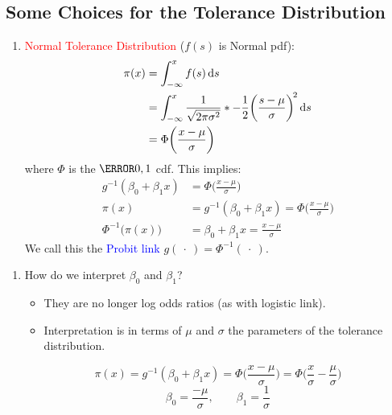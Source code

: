 \documentclass[oneside]{book}\usepackage[]{graphicx}\usepackage[svgnames]{xcolor}
\let\exp\relax%
\begin{document}
\subsection*{Some Choices for the Tolerance Distribution}
\begin{enumerate}[1.]
    \item \textcolor{Red}{Normal Tolerance Distribution} ($ f(s) $ is Normal pdf):
          \begin{align*}
              \pi(x)
               & =\int_{-\infty}^{x}f(s)\odif{s}                                                                                        \\
               & =\int_{-\infty}^{x}\frac{1}{\sqrt{2\pi\sigma^2}} \exp*{-\frac{1}{2} \biggl(\frac{s-\mu}{\sigma} \biggr)^{\!2}}\odif{s} \\
               & =\Phi\biggl(\frac{x-\mu}{\sigma}\biggr)
          \end{align*}
          where $ \Phi $ is the $ \N{0,1} $ cdf. This implies:
          \begin{align*}
              g^{-1}(\beta_0+\beta_1x)    & =\Phi\biggl(\frac{x-\mu}{\sigma}\biggr)                          \\
              \pi(x)                      & =g^{-1}(\beta_0+\beta_1x)=\Phi\biggl(\frac{x-\mu}{\sigma}\biggr) \\
              \Phi^{-1}\bigl(\pi(x)\bigr) & =\beta_0+\beta_1x=\frac{x-\mu}{\sigma}
          \end{align*}
          We call this the \textcolor{Blue}{Probit link} $ g(\:\cdot\:)=\Phi^{-1}(\:\cdot\:) $.
\end{enumerate}
\begin{enumerate}[1.]
    \item How do we interpret $ \beta_0 $ and $ \beta_1 $?
          \begin{itemize}
              \item They are no longer log odds ratios (as with logistic link).
              \item Interpretation is in terms of $ \mu $ and $ \sigma $ the parameters of the tolerance distribution.
          \end{itemize}
          \[ \pi(x)=g^{-1}(\beta_0+\beta_1x)=\Phi\biggl(\frac{x-\mu}{\sigma} \biggr)=\Phi\biggl(\frac{x}{\sigma} -\frac{\mu}{\sigma} \biggr) \]
          \[ \beta_0=\frac{-\mu}{\sigma},\qquad \beta_1=\frac{1}{\sigma} \]
\end{enumerate}
\end{document}
